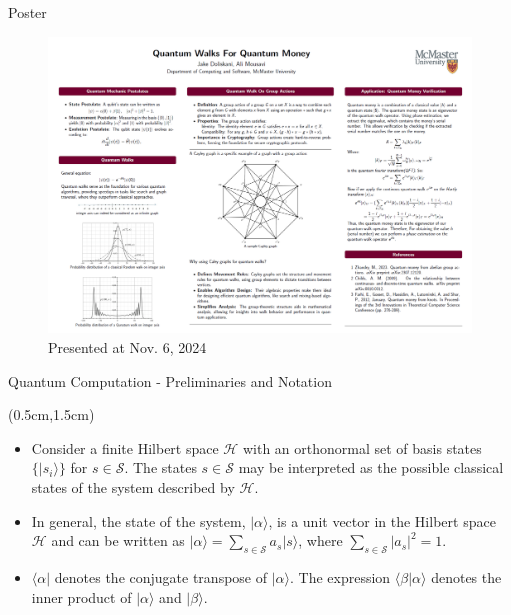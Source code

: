 \documentclass{beamer}
\theoremstyle{definition}
\begin{document}
\begin{frame}{Poster}
    
    \begin{figure}
        \centering
        \includegraphics[width=1\textwidth]{poster.png}
        \caption{Presented at Nov. 6, 2024}
    \end{figure}

\end{frame}




\begin{frame}{Quantum Computation - Preliminaries and Notation}
    
    \begin{textblock*}{12cm}(0.5cm,1.5cm)
        \begin{itemize}
            \item Consider a finite Hilbert space $\mathcal{H}$ with an orthonormal set of basis states $\{ \lvert s_i \rangle \}$ for $s \in \mathcal{S}$. The states $s \in \mathcal{S}$ may be interpreted as the possible classical states of the system described by $\mathcal{H}$. \\
            \vspace{1cm}
            \item In general, the state of the system, $\lvert \alpha \rangle$, is a unit vector in the Hilbert space $\mathcal{H}$ and can be written as $\lvert \alpha \rangle = \sum_{s \in \mathcal{S}} a_s \lvert s \rangle$, where $\sum_{s \in \mathcal{S}} |a_s|^2 = 1$. \\
            \vspace{1cm}
            \item $\langle \alpha \rvert$ denotes the conjugate transpose of $\lvert \alpha \rangle$. The expression $\langle \beta \rvert \alpha \rangle$ denotes the inner product of $\lvert \alpha \rangle$ and $\lvert \beta \rangle$.

        \end{itemize}
            
    \end{textblock*}
\end{frame}
\end{document}
